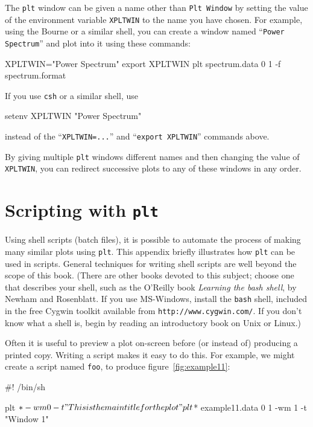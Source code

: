\documentclass{book}
\begin{document}
The {\tt plt} window can be given a name other than {\tt Plt Window} by
setting the value of the environment variable {\tt XPLTWIN} to
the name you have chosen.  For example, using the Bourne or a similar
shell, you can create a window named ``{\tt Power Spectrum}'' and plot
into it using these commands:

\begin{center}
\begin{boxedverbatim}
XPLTWIN="Power Spectrum"
export XPLTWIN
plt spectrum.data 0 1 -f spectrum.format
\end{boxedverbatim}
\end{center}

If you use {\tt csh} or a similar shell, use
\begin{center}
\begin{boxedverbatim}
setenv XPLTWIN "Power Spectrum"
\end{boxedverbatim}
\end{center}
instead of the ``{\tt XPLTWIN=...}'' and ``{\tt export XPLTWIN}'' commands
above.

By giving multiple {\tt plt} windows different names and then changing
the value of {\tt XPLTWIN}, you can redirect successive plots to any
of these windows in any order.

\chapter{Scripting with {\tt plt} \label{sec:scripting}}

Using shell scripts (batch files), it is possible to automate the
process of making many similar plots using {\tt plt}.  This appendix
briefly illustrates how {\tt plt} can be used in scripts.  General
techniques for writing shell scripts are well beyond the scope of this
book.  (There are other books devoted to this subject; choose one that
describes your shell, such as the O'Reilly book {\em Learning the bash
shell}, by Newham and Rosenblatt.  If you use MS-Windows, install the
{\tt bash} shell, included in the free Cygwin toolkit available from
{\tt http://www.cygwin.com/}.  If you don't know what a shell
is, begin by reading an introductory book on Unix or Linux.)

Often it is useful to preview a plot on-screen before (or instead of)
producing a printed copy.  Writing a script makes it easy to do this.
For example, we might create a script named {\tt foo}, to produce
figure~\ref{fig:example11}:

\begin{center}
\begin{boxedverbatim}
#! /bin/sh

plt $* -wm 0 -t "This is the main title for the plot"
plt $* example11.data 0 1 -wm 1 -t "Window 1"
\end{boxedverbatim}
\end{center}
\end{document}
